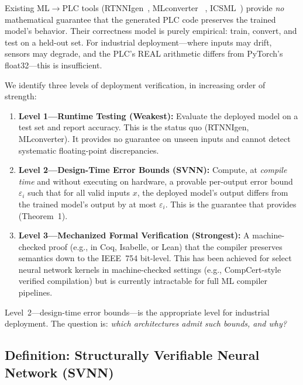 Existing ML$\to$PLC tools (RTNNIgen~\cite{rtnnigen2024}, MLconverter%
~\cite{mlconverter2025}, ICSML~\cite{icsml2023}) provide \textit{no}
mathematical guarantee that the generated PLC code preserves the trained
model's behavior. Their correctness model is purely empirical: train, convert,
and test on a held-out set. For industrial deployment---where inputs may
drift, sensors may degrade, and the PLC's REAL arithmetic differs from
PyTorch's float32---this is insufficient.

We identify three levels of deployment verification, in increasing order
of strength:

\begin{enumerate}
    \item \textbf{Level 1---Runtime Testing (Weakest):} Evaluate the deployed
          model on a test set and report accuracy. This is the status quo
          (RTNNIgen, MLconverter). It provides no guarantee on unseen inputs
          and cannot detect systematic floating-point discrepancies.
    \item \textbf{Level 2---Design-Time Error Bounds (SVNN):} Compute, at
          \textit{compile time} and without executing on hardware, a provable
          per-output error bound $\varepsilon_i$ such that for all valid
          inputs $x$, the deployed model's output differs from the trained
          model's output by at most $\varepsilon_i$. This is the guarantee
          that \neuroplc provides (Theorem~1).
    \item \textbf{Level 3---Mechanized Formal Verification (Strongest):}
          A machine-checked proof (e.g., in Coq, Isabelle, or Lean) that the
          compiler preserves semantics down to the IEEE~754 bit-level. This
          has been achieved for select neural network kernels in
          machine-checked settings (e.g., CompCert-style verified compilation)
          but is currently intractable for full ML compiler pipelines.
\end{enumerate}

Level~2---design-time error bounds---is the appropriate level for
industrial deployment. The question is: \textit{which architectures admit
such bounds, and why?}

\subsection{Definition: Structurally Verifiable Neural Network (SVNN)}
\label{sec:svnn-definition}


